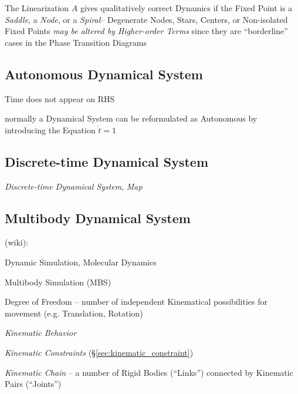 The Linearization $A$ gives qualitatively correct Dynamics if the Fixed Point
is a \emph{Saddle}, a \emph{Node}, or a \emph{Spiral}--
Degenerate Nodes, Stars, Centers, or Non-isolated Fixed Points \emph{may be
altered by Higher-order Terms} since they are ``borderline'' cases in the Phase
Transition Diagrams



\subsection{Autonomous Dynamical System}\label{sec:autonomous_dynamical_system}

Time does not appear on RHS

normally a Dynamical System can be reformulated as Autonomous by introducing
the Equation $\dot{t} = 1$



\subsection{Discrete-time Dynamical System}\label{sec:discrete_dynamical_system}

\emph{Discrete-time Dynamical System}, \emph{Map}



\subsection{Multibody Dynamical System}\label{sec:multibody_system}

(wiki):

Dynamic Simulation, Molecular Dynamics

Multibody Simulation (MBS)

Degree of Freedom -- number of independent Kinematical possibilities for
movement (e.g. Translation, Rotation)

\emph{Kinematic Behavior}

\emph{Kinematic Constraints} (\S\ref{sec:kinematic_constraint})

\emph{Kinematic Chain} -- a number of Rigid Bodies (``Links'') connected by
Kinematic Pairs (``Joints'')

